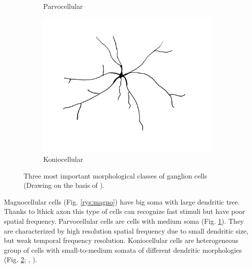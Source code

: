 \documentclass{pracalicmgr}
\begin{document}
\begin{figure}[H]
\begin{subfigure}{.33\textwidth}
		\caption{Parvocellular}
		\label{rys:parvo}
	\end{subfigure}
	\begin{subfigure}{.33\textwidth}
	\centering
	\includegraphics[width=1\linewidth]{cell_K2.png}
	\caption{Koniocellular}
	\label{rys:konio}
	\end{subfigure}
	\caption{Three most important morphological classes of ganglion cells  (Drawing on the basis of \cite{parallel}).}
	\label{rys:ganglio}
	\end{figure}
	 Magnocellular cells (Fig. \ref{rys:magno}) have big soma with large dendritic tree. Thanks to lthick axon this type of cells can recognize fast stimuli but have poor spatial frequency. Parvocellular cells are cells with medium soma (Fig. \ref{rys:parvo}). They are characterized by high resolution spatial frequency due to small dendritic size, but weak temporal frequency resolution. Koniocellular cells are heterogeneous group of cells with small-to-medium somata of different dendritic morphologies (Fig. \ref{rys:konio}; \cite{parallel}, \cite{viola}). 
	
	
\end{document}
